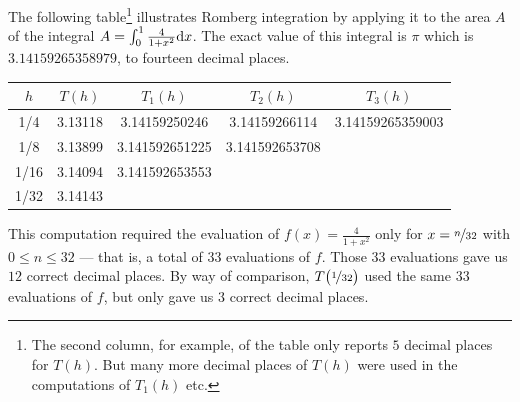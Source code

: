 \begin{eg}\label{eg:Romberg3}
The following table\footnote{The second column, for example,
of the table only reports $5$ decimal places for $T(h)$.
But many more decimal places of $T(h)$ were used in the computations
of $T_1(h)$ etc.}
illustrates Romberg integration by applying it to
the area $A$ of the integral $A=\int_0^1\frac{4}{1+x^2}\mathrm{d}x$.
The exact value of this integral is $\pi$ which is $3.14159265358979$,
to fourteen decimal places.


\begin{center}
     \begin{tabular}{|c|c|c|c|c|}
          \hline
          $h$ & $T(h)$ & $T_1(h)$ & $T_2(h)$ & $T_3(h)$\\ \hline
      1/4 & 3.13118
          & 3.14159250246
          & 3.14159266114
          & 3.14159265359003
          \\ \hline
      1/8 & 3.13899
          & 3.141592651225
          & 3.141592653708
          \\ \cline{1-4}
     1/16 & 3.14094
          & 3.141592653553
          \\ \cline{1-3}
     1/32 & 3.14143
     \\ \cline{1-2}
     \end{tabular}
\end{center}
This computation required the evaluation of $f(x)=\frac{4}{1+x^2}$ only
for $x=\nicefrac{n}{32}$ with $0\le n\le 32$ --- that is, a total
of $33$ evaluations of $f$. Those $33$ evaluations gave us $12$
correct decimal places. By way of comparison, $T\big(\nicefrac{1}{32}\big)$
used the same $33$ evaluations of $f$, but only gave us $3$ correct
decimal places.
\end{eg}


